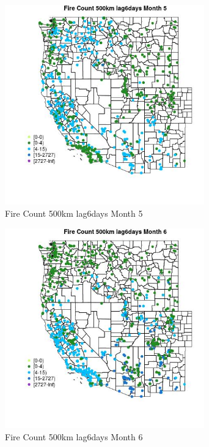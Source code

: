 \begin{figure} 
\centering  
\includegraphics[width=0.77\textwidth]{Code_Outputs/Report_ML_input_PM25_Step4_part_f_de_duplicated_aveswNAs_MapObsMo5Fire_Count_500km_lag6days.jpg} 
\caption{\label{fig:Report_ML_input_PM25_Step4_part_f_de_duplicated_aveswNAsMapObsMo5Fire_Count_500km_lag6days}Fire Count 500km lag6days Month 5} 
\end{figure} 
 

\begin{figure} 
\centering  
\includegraphics[width=0.77\textwidth]{Code_Outputs/Report_ML_input_PM25_Step4_part_f_de_duplicated_aveswNAs_MapObsMo6Fire_Count_500km_lag6days.jpg} 
\caption{\label{fig:Report_ML_input_PM25_Step4_part_f_de_duplicated_aveswNAsMapObsMo6Fire_Count_500km_lag6days}Fire Count 500km lag6days Month 6} 
\end{figure} 
 

